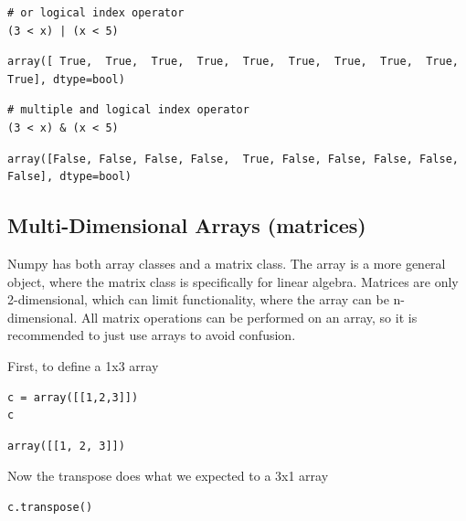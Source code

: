 \documentclass[%
oneside,                 %
final,                   %
10pt]{article}
\begin{document}
\begin{Verbatim}[numbers=none,fontsize=\fontsize{9pt}{9pt},baselinestretch=0.95,xleftmargin=2mm]
# or logical index operator
(3 < x) | (x < 5)
\end{Verbatim}

\begin{Verbatim}[numbers=none,fontsize=\fontsize{9pt}{9pt},baselinestretch=0.95,xleftmargin=2mm]
array([ True,  True,  True,  True,  True,  True,  True,  True,  True,  True], dtype=bool)
\end{Verbatim}

\begin{Verbatim}[numbers=none,fontsize=\fontsize{9pt}{9pt},baselinestretch=0.95,xleftmargin=2mm]
# multiple and logical index operator
(3 < x) & (x < 5)
\end{Verbatim}

\begin{Verbatim}[numbers=none,fontsize=\fontsize{9pt}{9pt},baselinestretch=0.95,xleftmargin=2mm]
array([False, False, False, False,  True, False, False, False, False, False], dtype=bool)
\end{Verbatim}

\subsection{Multi-Dimensional Arrays (matrices)}

Numpy has both array classes and a matrix class. The array is a more general object, where the matrix class is specifically for linear algebra. Matrices are only 2-dimensional, which can limit functionality, where the array can be n-dimensional. All matrix operations can be performed on an array, so it is recommended to just use arrays to avoid confusion.

First, to define a 1x3 array
\begin{Verbatim}[numbers=none,fontsize=\fontsize{9pt}{9pt},baselinestretch=0.95,xleftmargin=2mm]
c = array([[1,2,3]])
c
\end{Verbatim}

\begin{Verbatim}[numbers=none,fontsize=\fontsize{9pt}{9pt},baselinestretch=0.95,xleftmargin=2mm]
array([[1, 2, 3]])
\end{Verbatim}


Now the transpose does what we expected to a 3x1 array
\begin{Verbatim}[numbers=none,fontsize=\fontsize{9pt}{9pt},baselinestretch=0.95,xleftmargin=2mm]
c.transpose()
\end{Verbatim}
\end{document}
